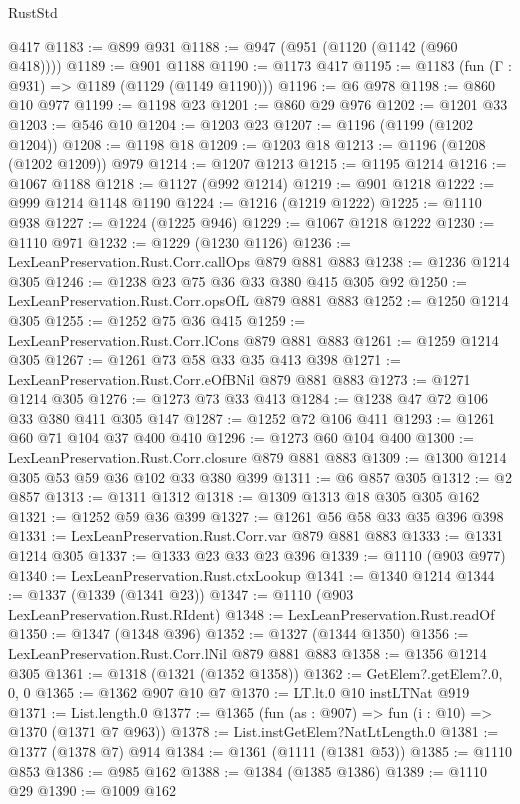 \begin{lexlean}{RustStd}
\begin{coremodule}
    @417
@1183 := @899 @931
@1188 := @947 (@951 (@1120 (@1142 (@960 @418))))
@1189 := @901 @1188
@1190 := @1173 @417
@1195 := @1183 (fun (Γ : @931) => @1189 (@1129 (@1149 @1190)))
@1196 := @6 @978
@1198 := @860 @10 @977
@1199 := @1198 @23
@1201 := @860 @29 @976
@1202 := @1201 @33
@1203 := @546 @10
@1204 := @1203 @23
@1207 := @1196 (@1199 (@1202 @1204))
@1208 := @1198 @18
@1209 := @1203 @18
@1213 := @1196 (@1208 (@1202 @1209)) @979
@1214 := @1207 @1213
@1215 := @1195 @1214
@1216 := @1067 @1188
@1218 := @1127 (@992 @1214)
@1219 := @901 @1218
@1222 := @999 @1214 @1148 @1190
@1224 := @1216 (@1219 @1222)
@1225 := @1110 @938
@1227 := @1224 (@1225 @946)
@1229 := @1067 @1218 @1222
@1230 := @1110 @971
@1232 := @1229 (@1230 @1126)
@1236 := LexLeanPreservation.Rust.Corr.callOps @879 @881 @883
@1238 := @1236 @1214 @305
@1246 := @1238 @23 @75 @36 @33 @380 @415 @305 @92
@1250 := LexLeanPreservation.Rust.Corr.opsOfL @879 @881 @883
@1252 := @1250 @1214 @305
@1255 := @1252 @75 @36 @415
@1259 := LexLeanPreservation.Rust.Corr.lCons @879 @881 @883
@1261 := @1259 @1214 @305
@1267 := @1261 @73 @58 @33 @35 @413 @398
@1271 := LexLeanPreservation.Rust.Corr.eOfBNil @879 @881 @883
@1273 := @1271 @1214 @305
@1276 := @1273 @73 @33 @413
@1284 := @1238 @47 @72 @106 @33 @380 @411 @305 @147
@1287 := @1252 @72 @106 @411
@1293 := @1261 @60 @71 @104 @37 @400 @410
@1296 := @1273 @60 @104 @400
@1300 := LexLeanPreservation.Rust.Corr.closure @879 @881 @883
@1309 := @1300 @1214 @305 @53 @59 @36 @102 @33 @380 @399
@1311 := @6 @857 @305
@1312 := @2 @857
@1313 := @1311 @1312
@1318 := @1309 @1313 @18 @305 @305 @162
@1321 := @1252 @59 @36 @399
@1327 := @1261 @56 @58 @33 @35 @396 @398
@1331 := LexLeanPreservation.Rust.Corr.var @879 @881 @883
@1333 := @1331 @1214 @305
@1337 := @1333 @23 @33 @23 @396
@1339 := @1110 (@903 @977)
@1340 := LexLeanPreservation.Rust.ctxLookup
@1341 := @1340 @1214
@1344 := @1337 (@1339 (@1341 @23))
@1347 := @1110 (@903 LexLeanPreservation.Rust.RIdent)
@1348 := LexLeanPreservation.Rust.readOf
@1350 := @1347 (@1348 @396)
@1352 := @1327 (@1344 @1350)
@1356 := LexLeanPreservation.Rust.Corr.lNil @879 @881 @883
@1358 := @1356 @1214 @305
@1361 := @1318 (@1321 (@1352 @1358))
@1362 := GetElem?.getElem?.{0, 0, 0}
@1365 := @1362 @907 @10 @7
@1370 := LT.lt.{0} @10 instLTNat @919
@1371 := List.length.{0}
@1377 := @1365 (fun (as : @907) => fun (i : @10) => @1370 (@1371 @7 @963))
@1378 := List.instGetElem?NatLtLength.{0}
@1381 := @1377 (@1378 @7) @914
@1384 := @1361 (@1111 (@1381 @53))
@1385 := @1110 @853
@1386 := @985 @162
@1388 := @1384 (@1385 @1386)
@1389 := @1110 @29
@1390 := @1009 @162

\end{coremodule}
\end{lexlean}
